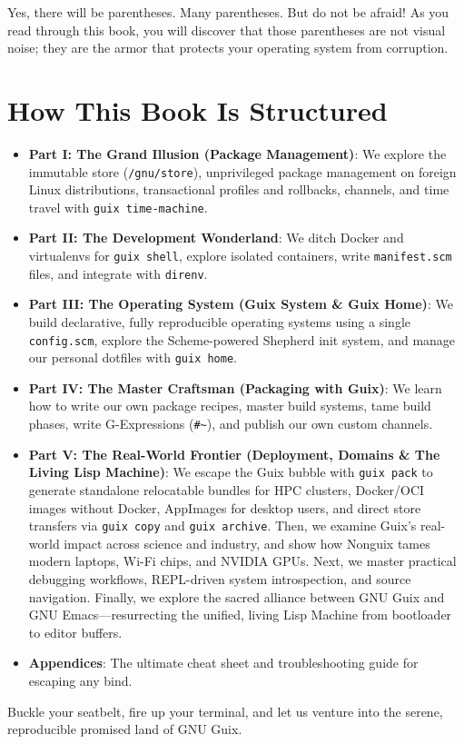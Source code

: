 Yes, there will be parentheses. Many parentheses. But do not be afraid! As you read through this book, you will discover that those parentheses are not visual noise; they are the armor that protects your operating system from corruption.

\section*{How This Book Is Structured}

\begin{itemize}
  \item \textbf{Part I: The Grand Illusion (Package Management)}: We explore the immutable store (\texttt{/gnu/store}), unprivileged package management on foreign Linux distributions, transactional profiles and rollbacks, channels, and time travel with \texttt{guix time-machine}.
  \item \textbf{Part II: The Development Wonderland}: We ditch Docker and virtualenvs for \texttt{guix shell}, explore isolated containers, write \texttt{manifest.scm} files, and integrate with \texttt{direnv}.
  \item \textbf{Part III: The Operating System (Guix System \& Guix Home)}: We build declarative, fully reproducible operating systems using a single \texttt{config.scm}, explore the Scheme-powered Shepherd init system, and manage our personal dotfiles with \texttt{guix home}.
  \item \textbf{Part IV: The Master Craftsman (Packaging with Guix)}: We learn how to write our own package recipes, master build systems, tame build phases, write G-Expressions (\texttt{\#\~{}}), and publish our own custom channels.
  \item \textbf{Part V: The Real-World Frontier (Deployment, Domains \& The Living Lisp Machine)}: We escape the Guix bubble with \texttt{guix pack} to generate standalone relocatable bundles for HPC clusters, Docker/OCI images without Docker, AppImages for desktop users, and direct store transfers via \texttt{guix copy} and \texttt{guix archive}. Then, we examine Guix's real-world impact across science and industry, and show how Nonguix tames modern laptops, Wi-Fi chips, and NVIDIA GPUs. Next, we master practical debugging workflows, REPL-driven system introspection, and source navigation. Finally, we explore the sacred alliance between GNU Guix and GNU Emacs---resurrecting the unified, living Lisp Machine from bootloader to editor buffers.
  \item \textbf{Appendices}: The ultimate cheat sheet and troubleshooting guide for escaping any bind.
\end{itemize}

Buckle your seatbelt, fire up your terminal, and let us venture into the serene, reproducible promised land of GNU Guix.
